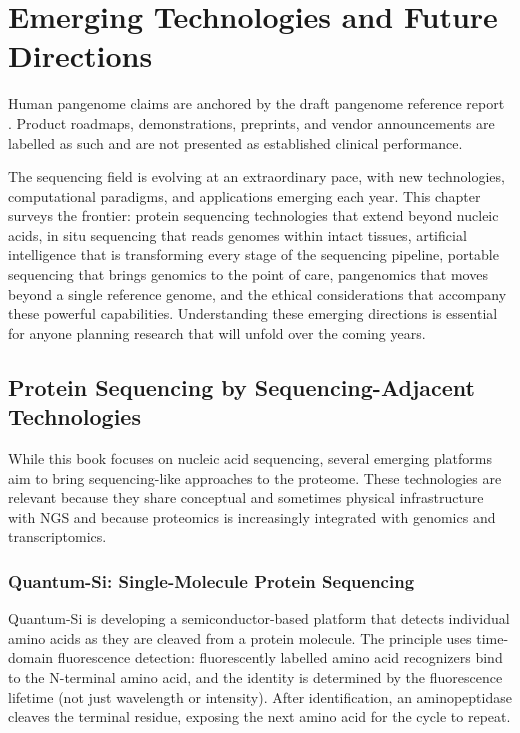 \chapter{Emerging Technologies and Future Directions}
\label{ch:emerging}

\begin{sourcebox}
Human pangenome claims are anchored by the draft pangenome reference report \cite{liao2023}. Product roadmaps, demonstrations, preprints, and vendor announcements are labelled as such and are not presented as established clinical performance.
\end{sourcebox}

\begin{keyconcept}
The sequencing field is evolving at an extraordinary pace, with new technologies, computational paradigms, and applications emerging each year. This chapter surveys the frontier: protein sequencing technologies that extend beyond nucleic acids, in situ sequencing that reads genomes within intact tissues, artificial intelligence that is transforming every stage of the sequencing pipeline, portable sequencing that brings genomics to the point of care, pangenomics that moves beyond a single reference genome, and the ethical considerations that accompany these powerful capabilities. Understanding these emerging directions is essential for anyone planning research that will unfold over the coming years.
\end{keyconcept}

\section{Protein Sequencing by Sequencing-Adjacent Technologies}
\label{sec:emerging:protein-seq}

While this book focuses on nucleic acid sequencing, several emerging platforms aim to bring sequencing-like approaches to the proteome. These technologies are relevant because they share conceptual and sometimes physical infrastructure with NGS and because proteomics is increasingly integrated with genomics and transcriptomics.

\subsection{Quantum-Si: Single-Molecule Protein Sequencing}
\label{subsec:emerging:quantum-si}

Quantum-Si is developing a semiconductor-based platform that detects individual amino acids as they are cleaved from a protein molecule. The principle uses time-domain fluorescence detection: fluorescently labelled amino acid recognizers bind to the N-terminal amino acid, and the identity is determined by the fluorescence lifetime (not just wavelength or intensity). After identification, an aminopeptidase cleaves the terminal residue, exposing the next amino acid for the cycle to repeat.


